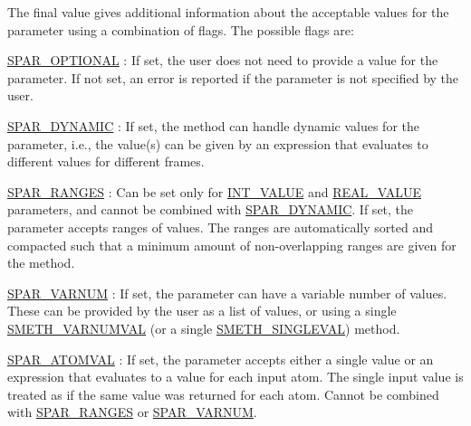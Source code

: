 \-The final value gives additional information about the acceptable values for the parameter using a combination of flags. \-The possible flags are\-:
\begin{DoxyItemize}
\item \hyperlink{share_2template_2gromacs_2selparam_8h_a9829627bea1b9a81fe204f333a6519b6}{\-S\-P\-A\-R\-\_\-\-O\-P\-T\-I\-O\-N\-A\-L} \-: \-If set, the user does not need to provide a value for the parameter. \-If not set, an error is reported if the parameter is not specified by the user.
\item \hyperlink{share_2template_2gromacs_2selparam_8h_ae44a94b4d013d2a344cfb3a9f8c5479f}{\-S\-P\-A\-R\-\_\-\-D\-Y\-N\-A\-M\-I\-C} \-: \-If set, the method can handle dynamic values for the parameter, i.\-e., the value(s) can be given by an expression that evaluates to different values for different frames.
\item \hyperlink{share_2template_2gromacs_2selparam_8h_ab39fef32ca729815df1299fafdd623b1}{\-S\-P\-A\-R\-\_\-\-R\-A\-N\-G\-E\-S} \-: \-Can be set only for \hyperlink{share_2template_2gromacs_2selvalue_8h_a70b42b87d434580bf1493591857b8becacd1ce0b084595a6072a57781dc7738a0}{\-I\-N\-T\-\_\-\-V\-A\-L\-U\-E} and \hyperlink{share_2template_2gromacs_2selvalue_8h_a70b42b87d434580bf1493591857b8beca7aa9587044cd6fd9c1f1690719a072cf}{\-R\-E\-A\-L\-\_\-\-V\-A\-L\-U\-E} parameters, and cannot be combined with \hyperlink{share_2template_2gromacs_2selparam_8h_ae44a94b4d013d2a344cfb3a9f8c5479f}{\-S\-P\-A\-R\-\_\-\-D\-Y\-N\-A\-M\-I\-C}. \-If set, the parameter accepts ranges of values. \-The ranges are automatically sorted and compacted such that a minimum amount of non-\/overlapping ranges are given for the method.
\item \hyperlink{share_2template_2gromacs_2selparam_8h_a400330277d7e17cdfef1610cc37838ea}{\-S\-P\-A\-R\-\_\-\-V\-A\-R\-N\-U\-M} \-: \-If set, the parameter can have a variable number of values. \-These can be provided by the user as a list of values, or using a single \hyperlink{share_2template_2gromacs_2selmethod_8h_ae0aa6a1bbb99ba5f0f6228c4cd401e0a}{\-S\-M\-E\-T\-H\-\_\-\-V\-A\-R\-N\-U\-M\-V\-A\-L} (or a single \hyperlink{share_2template_2gromacs_2selmethod_8h_a2de9fc1fca93570388059f72b064df08}{\-S\-M\-E\-T\-H\-\_\-\-S\-I\-N\-G\-L\-E\-V\-A\-L}) method.
\item \hyperlink{share_2template_2gromacs_2selparam_8h_ababaf52ada40922bb660a4949e1e52f0}{\-S\-P\-A\-R\-\_\-\-A\-T\-O\-M\-V\-A\-L} \-: \-If set, the parameter accepts either a single value or an expression that evaluates to a value for each input atom. \-The single input value is treated as if the same value was returned for each atom. \-Cannot be combined with \hyperlink{share_2template_2gromacs_2selparam_8h_ab39fef32ca729815df1299fafdd623b1}{\-S\-P\-A\-R\-\_\-\-R\-A\-N\-G\-E\-S} or \hyperlink{share_2template_2gromacs_2selparam_8h_a400330277d7e17cdfef1610cc37838ea}{\-S\-P\-A\-R\-\_\-\-V\-A\-R\-N\-U\-M}.

\end{DoxyItemize}
